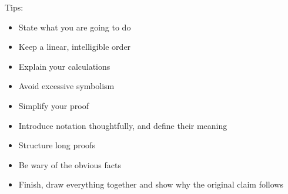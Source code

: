 Tips:
\begin{itemize}
    \item State what you are going to do
    \item Keep a linear, intelligible order
    \item Explain your calculations
    \item Avoid excessive symbolism
    \item Simplify your proof
    \item Introduce notation thoughtfully, and define their meaning
    \item Structure long proofs
    \item Be wary of the obvious facts
    \item Finish, draw everything together and show why the original claim follows
\end{itemize}

